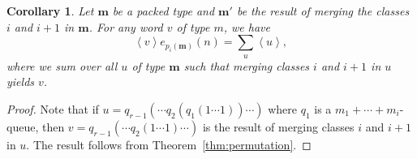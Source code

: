 \documentclass[reqno]{amsart}
\newcommand{\0}{\phantom{c}}
\newcommand{\swt}[1]{\left\langle #1 \right\rangle} %
\newcommand{\mm}{\mathbf{m}}
\let\sumnonlimits\sum
\renewcommand{\sum}{\sumnonlimits\limits}
\theoremstyle{plain}
\newtheorem{cor}[thm]{Corollary}
\theoremstyle{definition}
\numberwithin{equation}{section}
\begin{document}
\begin{cor}
\label{co:merge}
  Let $\mm$ be a packed type and $\mm'$ be the result of merging the classes $i$ and $i+1$ in $\mm$. For any word $v$ of type $m$, we have
  \[
  \swt{v} e_{p_i(\mm)}(n) = \sum_u \swt{u},
  \]
  where we sum over all $u$ of type $\mm$ such that merging classes $i$ and $i+1$ in $u$ yields $v$.
\end{cor}

\begin{proof}
  Note that if $u = q_{r-1}(\cdots q_2(q_1(1 \dotsm 1)) \cdots)$ where $q_1$ is a $m_1 + \cdots + m_i$-queue, then $v = q_{r-1}(\cdots q_2(1\dotsm 1)\cdots)$ is the result of merging classes $i$ and $i+1$ in $u$. The result follows from Theorem~\ref{thm:permutation}.
\end{proof}
\end{document}
